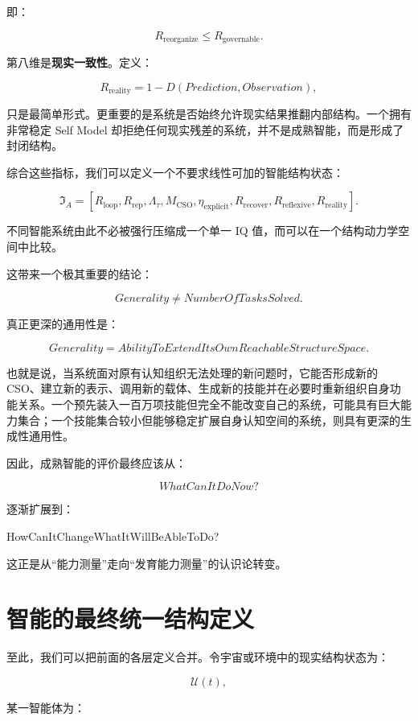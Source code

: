 即：

\[
R_{\mathrm{reorganize}}
\leq
R_{\mathrm{governable}}.
\]

第八维是\textbf{现实一致性}。定义：

\[
R_{\mathrm{reality}}
=
1
-
D(
Prediction,
Observation
),
\]

只是最简单形式。更重要的是系统是否始终允许现实结果推翻内部结构。一个拥有非常稳定 Self Model 却拒绝任何现实残差的系统，并不是成熟智能，而是形成了封闭结构。

综合这些指标，我们可以定义一个不要求线性可加的智能结构状态：

\[
\mathfrak I_A
=
\left[
R_{\mathrm{loop}},
R_{\mathrm{rep}},
\Lambda_\tau,
M_{\mathrm{CSO}},
\eta_{\mathrm{explicit}},
R_{\mathrm{recover}},
R_{\mathrm{reflexive}},
R_{\mathrm{reality}}
\right].
\]

不同智能系统由此不必被强行压缩成一个单一 IQ 值，而可以在一个结构动力学空间中比较。

这带来一个极其重要的结论：

\[
\boxed{
Generality
\neq
NumberOfTasksSolved.
}
\]

真正更深的通用性是：

\[
\boxed{
Generality
=
AbilityToExtendItsOwnReachableStructureSpace.
}
\]

也就是说，当系统面对原有认知组织无法处理的新问题时，它能否形成新的 CSO、建立新的表示、调用新的载体、生成新的技能并在必要时重新组织自身功能关系。一个预先装入一百万项技能但完全不能改变自己的系统，可能具有巨大能力集合；一个技能集合较小但能够稳定扩展自身认知空间的系统，则具有更深的生成性通用性。

因此，成熟智能的评价最终应该从：

\[
WhatCanItDoNow?
\]

逐渐扩展到：

\begin{statementbox}
HowCanItChangeWhatItWillBeAbleToDo?
\end{statementbox}

这正是从“能力测量”走向“发育能力测量”的认识论转变。

\section{智能的最终统一结构定义}

至此，我们可以把前面的各层定义合并。令宇宙或环境中的现实结构状态为：

\[
\mathcal U(t),
\]

某一智能体为：

